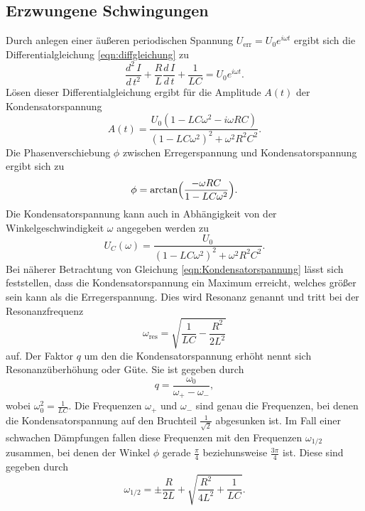     \subsection{Erzwungene Schwingungen}        
        Durch anlegen einer äußeren periodischen Spannung $U_\text{err} = U_0 e^{i \omega t }$ ergibt sich die Differentialgleichung \eqref{eqn:diffgleichung}
        zu
        \begin{equation}
            \label{eqn:diffgleichung2}
            \frac{d^2 \, I}{d \, t^2} + \frac{R}{L} \frac{d \, I}{d \, t} + \frac {1}{L C} = U_0 e^{i \omega t}.
        \end{equation}    
        Lösen dieser Differentialgleichung ergibt für die Amplitude $A(t)$ der Kondensatorspannung
        \begin{equation}
            \label{eqn:amplitude}
            A(t) = \frac{U_0 (1 - L C \omega^2 - i \omega R C)}{(1 - L C \omega^2)^2 + \omega^2 R^2 C^2}.
        \end{equation}
        Die Phasenverschiebung $\phi$ zwischen Erregerspannung und Kondensatorspannung ergibt sich zu
        \begin{equation}
            \label{eqn:phasenverschiebung}
            \phi = \arctan \Bigl( \frac {- \omega R C} {1 - L C \omega^2} \Bigr).
        \end{equation}
        Die Kondensatorspannung kann auch in Abhängigkeit von der Winkelgeschwindigkeit $\omega$ angegeben werden zu
        \begin{equation}
            \label{eqn:Kondensatorspannung}
            U_C(\omega) = \frac {U_0} {(1 - L C \omega^2)^2 + \omega^2 R^2 C^2}.
        \end{equation}
        Bei näherer Betrachtung von Gleichung \eqref{eqn:Kondensatorspannung} lässt sich feststellen, dass die Kondensatorspannung
        ein Maximum erreicht, welches größer sein kann als die Erregerspannung. Dies wird Resonanz genannt und tritt bei der Resonanzfrequenz
        \begin{equation}
            \label{eqn:Resonanzfrequenz}
            \omega_\text{res} = \sqrt{\frac{1}{L C} - \frac{R^2}{2 L^2}}
        \end{equation}
        auf. Der Faktor $q$ um den die Kondensatorspannung erhöht nennt sich Resonanzüberhöhung oder Güte. 
        Sie ist gegeben durch 
        \begin{equation}   
            \label{eqn:güte}
            q = \frac {\omega_0} {\omega_+ - \omega_-},
        \end{equation}
        wobei $\omega_0^2 = \frac{1}{L C}$.   
        Die Frequenzen $\omega_+$ und $\omega_-$ sind genau die Frequenzen, bei denen die Kondensatorspannung auf den Bruchteil $\frac{1}{\sqrt{2}}$
        abgesunken ist. Im Fall einer schwachen Dämpfungen fallen diese Frequenzen mit den Frequenzen $\omega_\text{$1/2$}$ zusammen, bei denen
        der Winkel $\phi$ gerade $\frac{\pi}{4}$ beziehunsweise $\frac{3 \pi}{4}$ ist.
        Diese sind gegeben durch
        \begin{equation}
            \label{eqn:omega12}
            \omega_\text{$1/2$} = \pm \frac{R}{2 L} + \sqrt{\frac{R^2}{4 L^2} + \frac{1}{L C} }.
        \end{equation}    